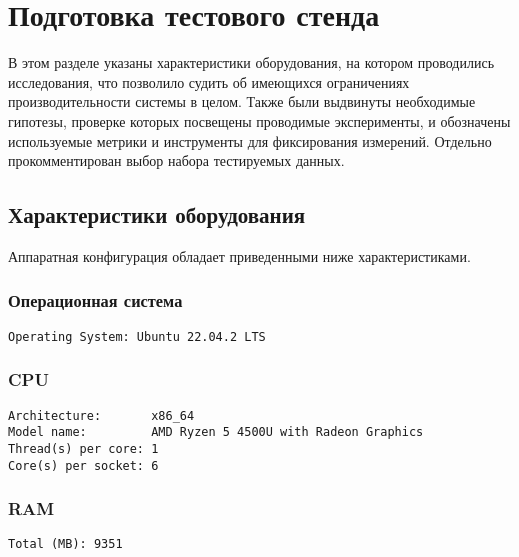 
\section{Подготовка тестового стенда}
В этом разделе указаны характеристики оборудования, на котором проводились исследования, что позволило судить об имеющихся ограничениях производительности системы в целом. Также были выдвинуты необходимые гипотезы, проверке которых посвещены проводимые эксперименты, и обозначены используемые метрики и инструменты для фиксирования измерений. Отдельно прокомментирован выбор набора тестируемых данных.



\subsection{Характеристики оборудования}
Аппаратная конфигурация обладает приведенными ниже характеристиками.
\subsubsection*{Операционная система}

\begin{verbatim}
Operating System: Ubuntu 22.04.2 LTS
\end{verbatim}

\subsubsection*{CPU}
\begin{verbatim}
Architecture:       x86_64
Model name:         AMD Ryzen 5 4500U with Radeon Graphics
Thread(s) per core: 1
Core(s) per socket: 6
\end{verbatim}

\subsubsection*{RAM}
\begin{verbatim}
Total (MB): 9351
\end{verbatim}



